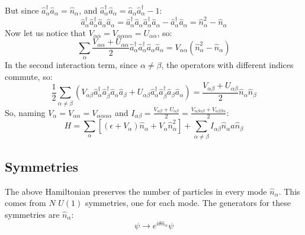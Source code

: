 \documentclass{article}
\begin{document}
But since $\hat{a}_\alpha^\dagger \hat{a}_\alpha = \hat{n}_\alpha$, and $\hat{a}_\alpha^\dagger \hat{a}_\alpha = \hat{a}_\alpha \hat{a}_\alpha^\dagger - 1$:
\begin{equation}
    \hat{a}_\alpha^\dagger \hat{a}_\alpha^\dagger \hat{a}_\alpha \hat{a}_\alpha = 
    \hat{a}_\alpha^\dagger \hat{a}_\alpha \hat{a}_\alpha^\dagger \hat{a}_\alpha - \hat{a}_\alpha^\dagger \hat{a}_\alpha = \hat{n}_\alpha^2 - \hat{n}_\alpha
\end{equation}
Now let us notice that $V_{\alpha\alpha} = V_{\alpha\alpha\alpha\alpha} = U_{\alpha\alpha}$, so:
\begin{equation}
    \sum_{\alpha} \frac{V_{\alpha\alpha} + U_{\alpha\alpha}}{2}  \hat{a}_\alpha^\dagger \hat{a}_\alpha^\dagger \hat{a}_\alpha \hat{a}_\alpha =
    V_{\alpha\alpha} \left(\hat{n}_\alpha^2 - \hat{n}_\alpha\right)
\end{equation}
In the second interaction term, since $\alpha \ne \beta$, the operators with different indices commute, so:
\begin{equation}
    \frac{1}{2}\sum_{\alpha \ne \beta} \left(V_{\alpha\beta} \hat{a}_\alpha^\dagger \hat{a}_\beta^\dagger \hat{a}_\alpha \hat{a}_\beta + U_{\alpha\beta} \hat{a}_\alpha^\dagger \hat{a}_\beta^\dagger \hat{a}_\beta \hat{a}_\alpha\right) =
    \frac{V_{\alpha\beta} + U_{\alpha\beta}}{2}\hat{n}_\alpha \hat{n}_\beta
\end{equation}
So, naming $V_\alpha = V_{\alpha\alpha} = V_{\alpha\alpha\alpha\alpha}$ and $I_{\alpha\beta} = \frac{V_{\alpha\beta} + U_{\alpha\beta}}{2} = \frac{V_{\alpha\beta\alpha\beta} + V_{\alpha\beta\beta\alpha}}{2}$:
\begin{equation}
    H = \sum_\alpha \left[\left(\epsilon + V_{\alpha}\right) \hat{n}_\alpha + V_\alpha \hat{n}_\alpha^2\right] + \sum_{\alpha \ne \beta} I_{\alpha\beta} \hat{n}_\alpha a\hat{n}_\beta
\end{equation}
\subsection{Symmetries}
The above Hamiltonian preserves the number of particles in every mode $\hat{n}_\alpha$. This comes from $N$ $U(1)$ symmetries, one for each mode. The generators for these symmetries are $\hat{n}_\alpha$:
\begin{equation}
    \psi \rightarrow e^{i\theta \hat{n}_\alpha} \psi
\end{equation}
\end{document}

